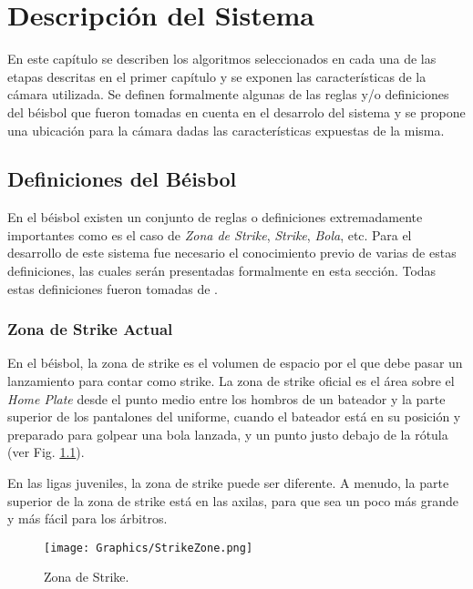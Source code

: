 \chapter{Descripción del Sistema}\label{chapter:description}

En este capítulo se describen los algoritmos seleccionados en cada una de las etapas descritas en el primer capítulo y se exponen las características de la cámara utilizada. Se definen formalmente algunas de las reglas y/o definiciones del béisbol que fueron tomadas en cuenta en el desarrolo del sistema y se propone una ubicación para la cámara dadas las características expuestas de la misma.

\section{Definiciones del Béisbol}

En el béisbol existen un conjunto de reglas o definiciones extremadamente importantes como es el caso de \textit{Zona de Strike}, \textit{Strike}, \textit{Bola}, etc. Para el desarrollo de este sistema fue necesario el conocimiento previo de varias de estas definiciones, las cuales serán presentadas formalmente en esta sección. Todas estas definiciones fueron tomadas de \cite{MLB}.

\subsection{Zona de Strike Actual}

En el béisbol, la zona de strike es el volumen de espacio por el que debe pasar un lanzamiento para contar como strike. La zona de strike oficial es el área sobre el \textit{Home Plate} desde el punto medio entre los hombros de un bateador y la parte superior de los pantalones del uniforme, cuando el bateador está en su posición y preparado para golpear una bola lanzada, y un punto justo debajo de la rótula (ver Fig. \ref{fig:StrikeZone}).

En las ligas juveniles, la zona de strike puede ser diferente. A menudo, la parte superior de la zona de strike está en las axilas, para que sea un poco más grande y más fácil para los árbitros.

\begin{figure}[!h]
    \centering
    \texttt{[image: Graphics/StrikeZone.png]}
    \caption{Zona de Strike.}
    \label{fig:StrikeZone}
\end{figure}

